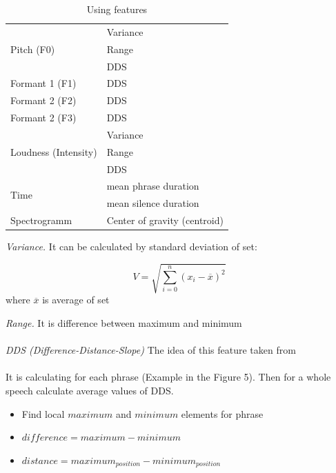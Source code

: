 \documentclass[12pt, letterpaper]{article}
\begin{document}
\begin{table}

\begin{tabular}{|p{2.2in}|p{2.2in}|} 
\hline
\multirow{3}{*}{Pitch (F0) }& Variance \\ \cline{2-2}
													& Range \\ \cline{2-2} 
													& DDS \\ \hline 
Formant 1 (F1) & DDS \\ \hline 
Formant 2 (F2) & DDS \\ \hline 
Formant 2 (F3) & DDS \\ \hline 
\multirow{3}{*}{Loudness (Intensity) } & Variance \\ \cline{2-2}
																		& Range \\ \cline{2-2}
																		& DDS \\ \hline 
\multirow{2}{*}{Time} & mean phrase duration \\ \cline{2-2} 
 & mean silence duration \\ \hline 
Spectrogramm & Center of gravity (centroid) \\ \hline 
\end{tabular}
	\caption{Using features}
	\label{Using features}
\end{table}
\emph{Variance.} It can be calculated by standard deviation of set:
\begin{center}
\[V=\sqrt{
\sum_{i=0}^{n}{
               (x_i-\overline{x})^2
               }
}
\]
 where  $\overline{x}$ is average of set\\
\end{center}
\emph{Range.} It is difference between maximum and minimum
\\\\
\emph{DDS (Difference-Distance-Slope)} The idea of this feature taken from\\ \cite["Real-time automatic emotion recognition
from speech"]{brittaelizabet}\\ It is calculating for each phrase (Example in the Figure 5). Then for a whole speech calculate average values of DDS.
\begin{itemize}
	\item Find local $maximum$ and $minimum$ elements for phrase
	\item $difference=maximum-minimum$
	\item $distance=maximum_{position}-minimum_{position}$
\end{itemize}
\end{document}
